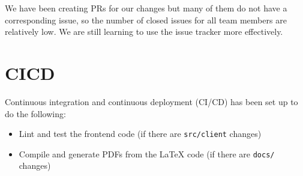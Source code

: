 \documentclass{article}
\begin{document}
We have been creating PRs for our changes but many of them do not have a
corresponding issue, so the number of closed issues for all team members are
relatively low. We are still learning to use the issue tracker more effectively.

\section{CICD}

Continuous integration and continuous deployment (CI/CD) has been set up to do the following:
\begin{itemize}
    \item Lint and test the frontend code (if there are \texttt{src/client}
    changes)
    \item Compile and generate PDFs from the LaTeX code (if there are
    \texttt{docs/} changes)
\end{itemize}
\end{document}
